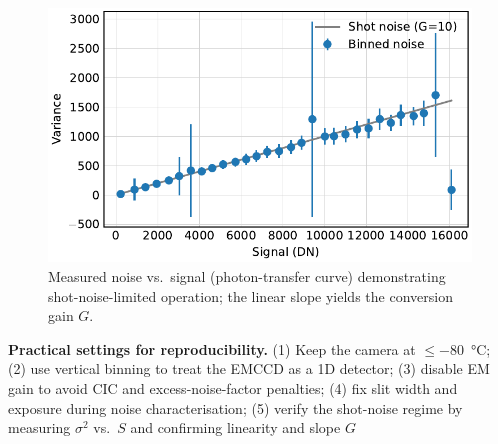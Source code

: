 \documentclass[
	parskip=half,
	a4paper,
]{scrarticle}
\begin{document}
\begin{figure}
    \centering
    \includegraphics{../analysis/figures/shot noise.pdf}
    \caption{Measured noise vs.\ signal (photon-transfer curve) demonstrating shot-noise-limited operation; the linear slope yields the conversion gain \(G\).}
    \label{fig:shotnoise}
\end{figure}

\textbf{Practical settings for reproducibility.}
(1) Keep the camera at \(\leq\)\SI{-80}{\degreeCelsius}; (2) use vertical binning to treat the EMCCD as a 1D detector; (3) disable EM gain to avoid CIC and excess-noise-factor penalties; (4) fix slit width and exposure during noise characterisation; (5) verify the shot-noise regime by measuring \(\sigma^2\) vs.\ \(S\) and confirming linearity and slope \(G\)
\end{document}
